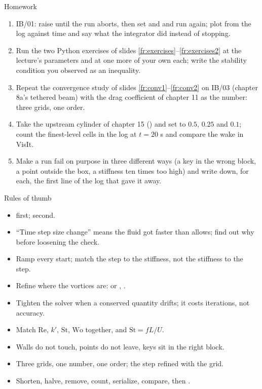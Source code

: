 \documentclass[aspectratio=169,11pt]{beamer}
\begin{document}
\begin{frame}{Homework}
\label{fr:hw}
\footnotesize
\begin{enumerate}
  \item IB/01: raise  until the run aborts, then set  and  and run again; plot  from the log against time and say what the integrator did instead of stopping.
  \item Run the two Python exercises of slides \ref{fr:exercises}--\ref{fr:exercises2} at the lecture's parameters and at one more of your own each; write the stability condition you observed as an inequality.
  \item Repeat the convergence study of slides \ref{fr:conv1}--\ref{fr:conv2} on IB/03 (chapter 8a's tethered beam) with the drag coefficient of chapter 11 as the number: three grids, one order.
  \item Take the upstream cylinder of chapter 15 () and set  to $0.5$, $0.25$ and $0.1$; count the finest-level cells in the log at $t = 20$ s and compare the wake in VisIt.
  \item Make a run fail on purpose in three different ways (a key in the wrong block, a point outside the box, a stiffness ten times too high) and write down, for each, the first line of the log that gave it away.
\end{enumerate}
\end{frame}

\begin{frame}{Rules of thumb}
\label{fr:thumb}
\small
\begin{itemize}
  \item {} first;  second.
  \item ``Time step size change'' means the fluid got faster than  allows; find out why before loosening the check.
  \item Ramp every start; match the step to the stiffness, not the stiffness to the step.
  \item Refine where the vortices are:  or , .
  \item Tighten the solver when a conserved quantity drifts; it costs iterations, not accuracy.
  \item Match $\mathrm{Re}$, $k'$, $\mathrm{St}$, $\mathrm{Wo}$ together, and $\mathrm{St} = fL/U$.
  \item Walls do not touch, points do not leave, keys sit in the right block.
  \item Three grids, one number, one order; the step refined with the grid.
  \item Shorten, halve, remove, count, serialize, compare, then .
\end{itemize}
\end{frame}
\end{document}
